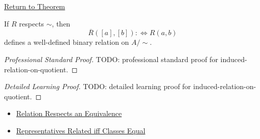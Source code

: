 \newpage
{}
\label{prf:induced-relation-on-quotient}

\begin{remark*}[Return]
\hyperref[thm:induced-relation-on-quotient]{Return to Theorem}
\end{remark*}

\begin{theorem*}
If $R$ respects $\sim$, then
\[
\overline{R}([a],[b]):\Longleftrightarrow R(a,b)
\]
defines a well-defined binary relation on $A/{\sim}$.
\end{theorem*}

\begin{proof}[Professional Standard Proof]
\LRAProofBodyStart
TODO: professional standard proof for induced-relation-on-quotient.
\end{proof}

\begin{proof}[Detailed Learning Proof]
\LRAProofBodyStart
TODO: detailed learning proof for induced-relation-on-quotient.
\end{proof}

\begin{remark*}
\end{remark*}

\begin{dependencies}
\begin{itemize}
  \item \hyperref[def:relation-respects-equivalence]{Relation Respects an Equivalence}
  \item \hyperref[prop:representatives-related-iff-classes-equal]{Representatives Related iff Classes Equal}
\end{itemize}
\end{dependencies}

\clearpage
